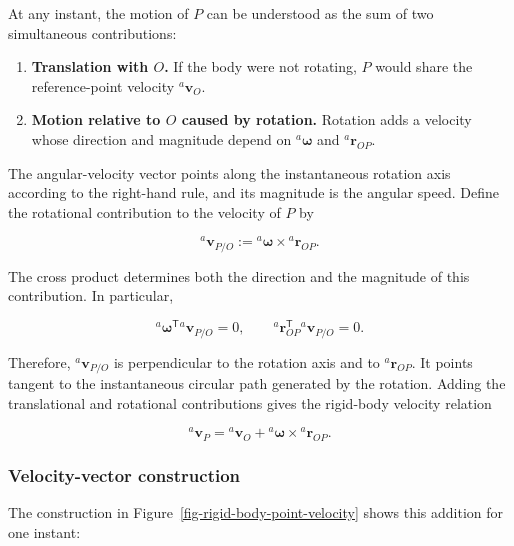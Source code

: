 \documentclass[
  australian,
  12pt,
  letterpaper,
  DIV=11,
  numbers=noendperiod,
  twoside]{scrreprt}
\providecommand{\tightlist}{%
  \setlength{\itemsep}{0pt}\setlength{\parskip}{0pt}}
\begin{document}
At any instant, the motion of \(P\) can be understood as the sum of two
simultaneous contributions:

\begin{enumerate}
\def\labelenumi{\arabic{enumi}.}
\tightlist
\item
  \textbf{Translation with \(O\).} If the body were not rotating, \(P\)
  would share the reference-point velocity \({}^{a}\mathbf v_O\).
\item
  \textbf{Motion relative to \(O\) caused by rotation.} Rotation adds a
  velocity whose direction and magnitude depend on
  \({}^{a}\boldsymbol{\omega}\) and \({}^{a}\mathbf r_{OP}\).
\end{enumerate}

The angular-velocity vector points along the instantaneous rotation axis
according to the right-hand rule, and its magnitude is the angular
speed. Define the rotational contribution to the velocity of \(P\) by

\[
{}^{a}\mathbf{v}_{P/O}
\mathrel{:=}
{}^{a}\boldsymbol{\omega}\times{}^{a}\mathbf{r}_{OP}.
\]

The cross product determines both the direction and the magnitude of
this contribution. In particular,

\[
{}^{a}\boldsymbol{\omega}^{\mathsf T}{}^{a}\mathbf{v}_{P/O}=0,
\qquad
{}^{a}\mathbf{r}_{OP}^{\mathsf T}{}^{a}\mathbf{v}_{P/O}=0.
\]

Therefore, \({}^{a}\mathbf{v}_{P/O}\) is perpendicular to the rotation
axis and to \({}^{a}\mathbf r_{OP}\). It points tangent to the
instantaneous circular path generated by the rotation. Adding the
translational and rotational contributions gives the rigid-body velocity
relation

\[
\boxed{
{}^{a}\mathbf{v}_P
=
{}^{a}\mathbf{v}_O
+{}^{a}\boldsymbol{\omega}\times{}^{a}\mathbf{r}_{OP}
}.
\]

\subsubsection{Velocity-vector
construction}\label{velocity-vector-construction}

The construction in Figure~\ref{fig-rigid-body-point-velocity} shows
this addition for one instant:
\end{document}
